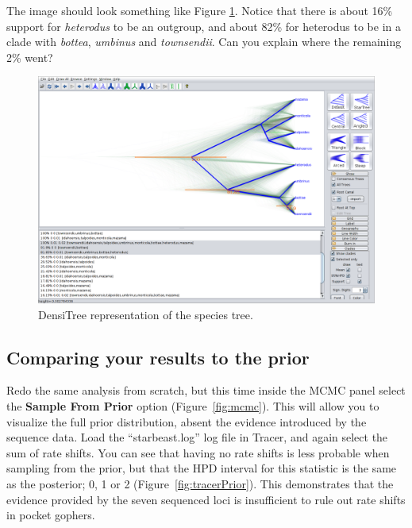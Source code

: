 \documentclass{article}
\begin{document}
The image should look something like Figure \ref{fig:densitree}. Notice that
there is about 16\% support for \textit{heterodus} to be an outgroup, and about
82\% for heterodus to be in a clade with \textit{bottea}, \textit{umbinus} and
\textit{townsendii}. Can you explain where the remaining 2\% went?

\begin{figure}
\centering
\includegraphics[width=\textwidth]{figures/densitree.png}
\caption{DensiTree representation of the species tree.}
\label{fig:densitree}
\end{figure}

\clearpage

\subsection*{Comparing your results to the prior}

Redo the same analysis from scratch, but this time inside the MCMC panel select
the \textbf{Sample From Prior} option (Figure~\ref{fig:mcmc}). This will allow
you to visualize the full prior distribution, absent the evidence introduced by
the sequence data. Load the ``starbeast.log'' log file in Tracer, and again
select the sum of rate shifts. You can see that having no rate shifts is less
probable when sampling from the prior, but that the HPD interval for this
statistic is the same as the posterior; 0, 1 or 2
(Figure~\ref{fig:tracerPrior}). This demonstrates that the evidence provided by
the seven sequenced loci is insufficient to rule out rate shifts in pocket gophers.
\end{document}
